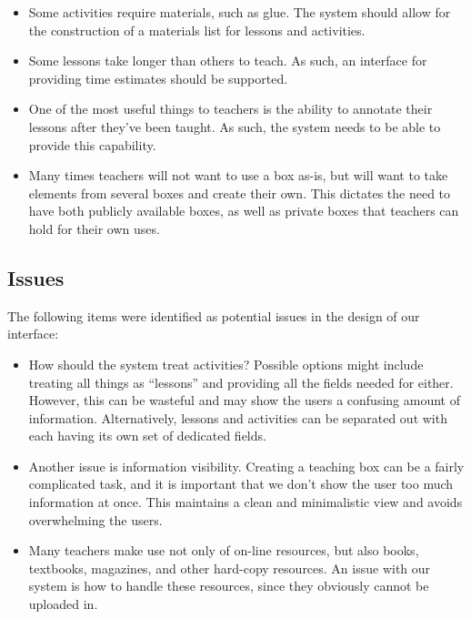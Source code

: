 \documentclass[12pt,titlepage]{article}
\begin{document}
\begin{itemize}
\item Some activities require materials, such as glue.  The system should allow
      for the construction of a materials list for lessons and activities.

\item Some lessons take longer than others to teach.  As such, an interface for
      providing time estimates should be supported.

\item One of the most useful things to teachers is the ability to annotate their
      lessons after they've been taught.  As such, the system needs to be able
      to provide this capability.

\item Many times teachers will not want to use a box as-is, but will want to
      take elements from several boxes and create their own.  This dictates the
      need to have both publicly available boxes, as well as private boxes that
      teachers can hold for their own uses.
\end{itemize}

\subsection{Issues}

The following items were identified as potential issues in the design of our
interface:

\begin{itemize}
\item How should the system treat activities?  Possible options might include
      treating all things as ``lessons'' and providing all the fields needed
      for either.  However, this can be wasteful and may show the users a
      confusing amount of information.  Alternatively, lessons and activities
      can be separated out with each having its own set of dedicated fields.

\item Another issue is information visibility.  Creating a teaching box can be
      a fairly complicated task, and it is important that we don't show the
      user too much information at once.  This maintains a clean and minimalistic
      view and avoids overwhelming the users.

\item Many teachers make use not only of on-line resources, but also books,
      textbooks, magazines, and other hard-copy resources.  An issue with our
      system is how to handle these resources, since they obviously cannot be
      uploaded in.
\end{itemize}
\end{document}
